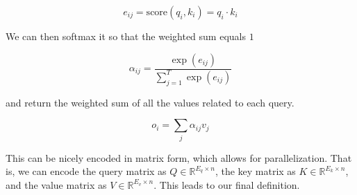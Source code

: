\documentclass{article}
\begin{document}
    \begin{equation} 
      e_{ij} = \mathrm{score}(q_i, k_i) = q_i \cdot k_i 
    \end{equation} 

    We can then softmax it so that the weighted sum equals $1$ 

    \begin{equation} 
      \alpha_{ij} = \frac{\exp(e_{ij})}{\sum_{j=1}^T \exp(e_{ij})}
    \end{equation}

    and return the weighted sum of all the values related to each query. 

    \begin{equation} 
      o_i = \sum_j \alpha_{ij} v_j
    \end{equation}

    This can be nicely encoded in matrix form, which allows for parallelization. That is, we can encode the query matrix as $Q \in \mathbb{R}^{E_q \times n}$, the key matrix as $K \in \mathbb{R}^{E_k \times n}$, and the value matrix as $V \in \mathbb{R}^{E_v \times n}$. This leads to our final definition. 
\end{document}
